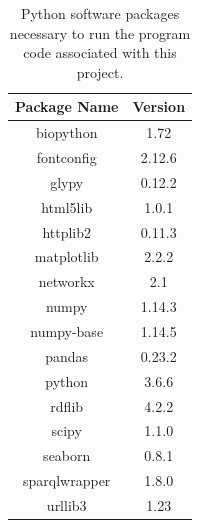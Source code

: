 \documentclass[12pt,a4paper]{article}
\begin{document}
\begin{table}[h]
\centering
\begin{tabular}{|c|c|} \hline
{\bf Package Name} & {\bf Version} \\ \hline
biopython   &               1.72 \\ \hline
fontconfig    &             2.12.6 \\ \hline
glypy       &               0.12.2 \\ \hline
html5lib   &                1.0.1 \\ \hline
httplib2   &                0.11.3 \\ \hline
matplotlib &                2.2.2 \\ \hline
networkx  &                 2.1 \\ \hline
numpy    &                  1.14.3 \\ \hline
numpy-base   &              1.14.5 \\ \hline
pandas  &                   0.23.2 \\ \hline
python   &                  3.6.6 \\ \hline
rdflib  &                   4.2.2 \\ \hline
scipy   &                   1.1.0 \\ \hline
seaborn  &                  0.8.1 \\ \hline
sparqlwrapper   &           1.8.0 \\ \hline
urllib3      &              1.23 \\ \hline
\end{tabular}
\caption{Python software packages necessary to run the program code associated with this project.}
\label{tab:software_dependencies}
\end{table}
\end{document}
